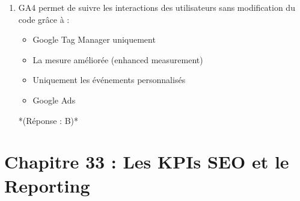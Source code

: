\documentclass[12pt,a4paper,twoside]{report}
\begin{document}
\begin{enumerate}
    \item GA4 permet de suivre les interactions des utilisateurs sans modification du code grâce à :
    \begin{itemize}
        \item[A)] Google Tag Manager uniquement
        \item[B)] La mesure améliorée (enhanced measurement)
        \item[C)] Uniquement les événements personnalisés
        \item[D)] Google Ads
    \end{itemize}
    *(Réponse : B)*
\end{enumerate}
\section*{Chapitre 33 : Les KPIs SEO et le Reporting}
\end{document}
